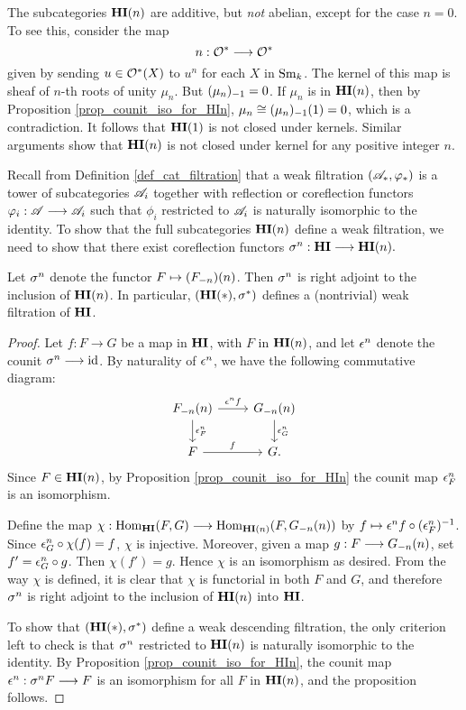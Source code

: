 \begin{rmk}
The subcategories $\LHI[n]{\HI}$ are additive, but \emph{not} 
abelian, except for the case $n = 0$. To see this, consider the 
map
\[
n: \Ox \to \Ox
\]
given by sending $u \in \Ox(X)$ to $u^n$ for each $X$ in $\Sm$.
The kernel of this map is sheaf of $n$-th roots of unity $\mu_n$.
But $\RHI{(\mu_n)} = 0$. If $\mu_n$ is in $\LHI[n]{\HI}$, then
by Proposition \ref{prop_counit_iso_for_HIn}, $\mu_n \cong
\LHI[1]{\RHI[1]{(\mu_n)}} = 0$, which is a contradiction. It 
follows that $\LHI{\HI}$ is not closed under kernels. Similar 
arguments show that $\LHI[n]{\HI}$ is not closed under kernel for 
any positive integer $n$.
\end{rmk}

Recall from Definition \ref{def_cat_filtration} that a
weak filtration $(\Cat{A}_*, \phi_*)$ is a tower of 
subcategories $\Cat{A}_i$ together with reflection or coreflection
functors $\phi_i: \Cat{A} \to \Cat{A}_i$ such that $\phi_i$ 
restricted to $\Cat{A}_i$ is naturally isomorphic to the identity.
To show that the full subcategories $\LHI[n]{\HI}$ define a weak
filtration, we need to show that there exist coreflection functors 
$\sgHI{n}: \HI \to \LHI[n]{\HI}.$ 

\begin{prop}\label{prop_HI_upper_slice}
Let $\sgHI{n}$ denote the functor $F \mapsto 
\LHI[n]{(\RHI[n]{F})}$. Then $\sgHI{n}$ is right adjoint to the 
inclusion of $\LHI[n]{\HI}$. In particular, $(\LHI[*]{\HI}, 
\sgHI{*})$ defines a (nontrivial) weak filtration of $\HI$.
\end{prop}
\begin{proof}
Let $f: F \to G$ be a map in $\HI$, with $F$ in $\LHI[n]{\HI}$,
and let $\cuHI^n$ denote the counit $\sgHI{n} \to \id$.
By naturality of $\cuHI^n$, we have the following commutative 
diagram:
\[
\begin{tikzcd}
\LHI[n]{\RHI[n]{F}} \arrow{r}{\cuHI^n f}\arrow{d}{\cuHI^n_F} 
& \LHI[n]{\RHI[n]{G}} \arrow{d}{\cuHI^n_G} \\
F \arrow{r}{f}
& G.
\end{tikzcd}
\]
Since $F \in \LHI[n]{\HI}$, by Proposition 
\ref{prop_counit_iso_for_HIn} the counit map $\cuHI^n_F$ is an 
isomorphism.

Define the map $\chi: \homHI(F, G) \to \hom_{\LHI[n]{\HI}}(F, 
\LHI[n]{\RHI[n]{G}})$ by $f \mapsto 
\cuHI^n f \comp (\cuHI^n_F)^{-1}$. Since $\cuHI^n_G \comp \chi(f) 
= f$, $\chi$ is injective.  Moreover, given a map $g: F 
\to \LHI[n]{\RHI[n]{G}}$, set $f' = \cuHI_G^n \comp g$. Then 
$\chi(f') = g$. Hence $\chi$ is an isomorphism as desired.
From the way $\chi$ is defined, it is clear that $\chi$ is 
functorial in both $F$ and $G$, and therefore $\sgHI{n}$ is
right adjoint to the inclusion of $\LHI[n]{\HI}$ into $\HI$.

To show that $(\LHI[*]{\HI}, \sgHI{*})$ define a weak descending
filtration, the only criterion left to check is that $\sgHI{n}$
restricted to $\LHI[n]{\HI}$ is naturally isomorphic to the
identity. By Proposition \ref{prop_counit_iso_for_HIn}, the
counit map $\cuHI^n: \sgHI{n} F \to F$ is an isomorphism for
all $F$ in $\LHI[n]{\HI}$, and the proposition follows.
\end{proof}

